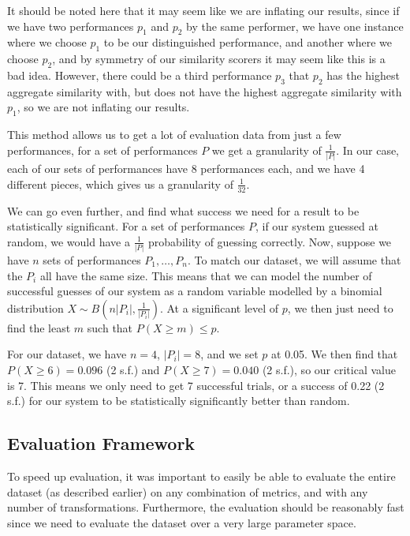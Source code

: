 \documentclass[oneside, class=book, 12pt, crop=false]{standalone}
\begin{document}
It should be noted here that it may seem like we are inflating our results, since if we have two performances $p_1$ and $p_2$ by the same performer, we have one instance where we choose $p_1$ to be our distinguished performance, and another where we choose $p_2$, and by symmetry of our similarity scorers it may seem like this is a bad idea. However, there could be a third performance $p_3$ that $p_2$ has the highest aggregate similarity with, but does not have the highest aggregate similarity with $p_1$, so we are not inflating our results.

This method allows us to get a lot of evaluation data from just a few performances, for a set of performances $P$ we get a granularity of $\frac{1}{|P|}$. In our case, each of our sets of performances have 8 performances each, and we have 4 different pieces, which gives us a granularity of $\frac{1}{32}$.

We can go even further, and find what success we need for a result to be statistically significant. For a set of performances $P$, if our system guessed at random, we would have a $\frac{1}{|P|}$ probability of guessing correctly. Now, suppose we have $n$ sets of performances $P_1, \ldots, P_n$. To match our dataset, we will assume that the $P_i$ all have the same size. This means that we can model the number of successful guesses of our system as a random variable modelled by a binomial distribution $X \sim B(n|P_i|, \frac{1}{|P_i|})$. At a significant level of $p$, we then just need to find the least $m$ such that $P(X \geq m) \leq p$.

For our dataset, we have $n=4$, $|P_i| = 8$, and we set $p$ at 0.05. We then find that $P(X \geq 6) = 0.096$ (2 s.f.) and $P(X \geq 7) = 0.040$ (2 s.f.), so our critical value is 7. This means we only need to get 7 successful trials, or a success of 0.22 (2 s.f.) for our system to be statistically significantly better than random.

\subsection{Evaluation Framework}

To speed up evaluation, it was important to easily be able to evaluate the entire dataset (as described earlier) on any combination of metrics, and with any number of transformations. Furthermore, the evaluation should be reasonably fast since we need to evaluate the dataset over a very large parameter space.
\end{document}
